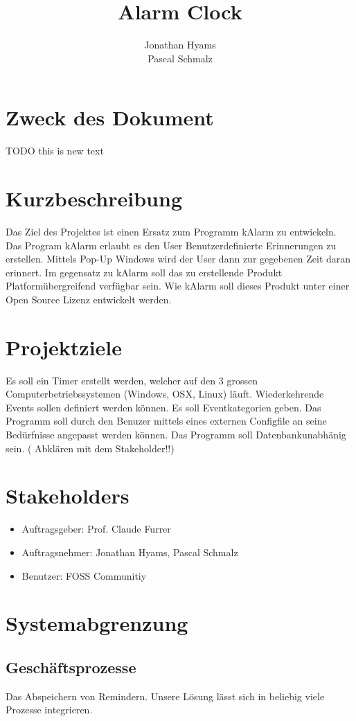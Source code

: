 \documentclass[11pt,titelpage]{scrreprt}
\title{Alarm Clock }
\author{Jonathan Hyams \\Pascal Schmalz}
\begin{document}
\thispagestyle{empty}
\maketitle
\tableofcontents

\pagestyle{fancy}


\begin{abstract}
\end{abstract}
\section{Zweck des Dokument}
TODO this is new text

\section{Kurzbeschreibung}
Das Ziel des Projektes ist einen Ersatz zum Programm kAlarm zu entwickeln.
Das Program kAlarm erlaubt es den User Benutzerdefinierte Erinnerungen zu erstellen. Mittels Pop-Up Windows wird der User dann zur gegebenen Zeit daran erinnert.
Im gegensatz zu kAlarm soll das zu erstellende Produkt Platformübergreifend verfügbar sein. Wie kAlarm soll dieses Produkt unter einer Open Source Lizenz entwickelt werden.
\section{Projektziele}
Es soll ein Timer erstellt werden, welcher auf den 3 grossen Computerbetriebssystemen (Windows, OSX, Linux)  läuft.
Wiederkehrende Events sollen definiert werden können.
Es soll Eventkategorien geben.
Das Programm soll durch den Benuzer mittels  eines externen Configfile an seine Bedürfnisse angepasst werden können.
Das Programm soll Datenbankunabhänig sein. ( Abklären mit dem Stakeholder!!)
\section{Stakeholders}
\begin{itemize}
\item{Auftragsgeber: Prof. Claude Furrer}
\item{Auftragsnehmer: Jonathan Hyams, Pascal Schmalz}
\item{Benutzer: FOSS Communitiy}
\end{itemize}
\section {Systemabgrenzung}
\subsection{Geschäftsprozesse}
Das Abspeichern von Remindern. Unsere Lösung lässt sich in beliebig viele Prozesse integrieren.
\end{document}
